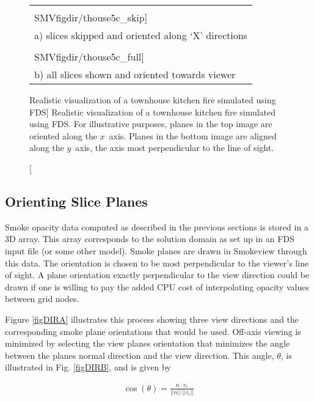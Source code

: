{\begin{figure}[bph]
\begin{center}
\begin{tabular}{l}
\texttt{[image: \\SMVfigdir/thouse5c\_skip]}\\
a) slices skipped and oriented along `X' directions\\
\texttt{[image: \\SMVfigdir/thouse5c\_full]}\\
b) all slices shown and oriented towards viewer \\
\end{tabular}
\end{center}
\caption
[Realistic visualization of a townhouse kitchen fire simulated using FDS]
{Realistic visualization of a townhouse
kitchen fire simulated using FDS. For illustrative purposes,
planes in the top image are oriented along the $x$~axis.  Planes
in the bottom image are aligned along the $y$~axis, the axis most
perpendicular to the line of sight.}
\label{figsmoke3d}%
\end{figure}


\subsection{Orienting Slice Planes}

Smoke opacity data computed as described in the previous sections
is stored in a 3D array. This array corresponds to the solution
domain as set up in an FDS input file (or some other model). Smoke
planes are drawn in Smokeview through this data.  The orientation
is chosen to be most perpendicular to the viewer's line of sight.
A plane orientation exactly perpendicular to the view direction
could be drawn if one is willing to pay the added CPU cost of
interpolating opacity values between grid nodes.

Figure \ref{figDIRA} illustrates this process showing three view
directions and the corresponding smoke plane orientations that
would be used. Off-axis viewing is minimized by selecting the view
planes orientation that minimizes the angle between the planes
normal direction and the view direction. This angle, $\theta$, is
illustrated in Fig. \ref{figDIRB}, and is given by

\begin{eqnarray}
\cos(\theta)=\frac{n\cdot v_e}{||n||~||v_e||}
\end{eqnarray}

}
